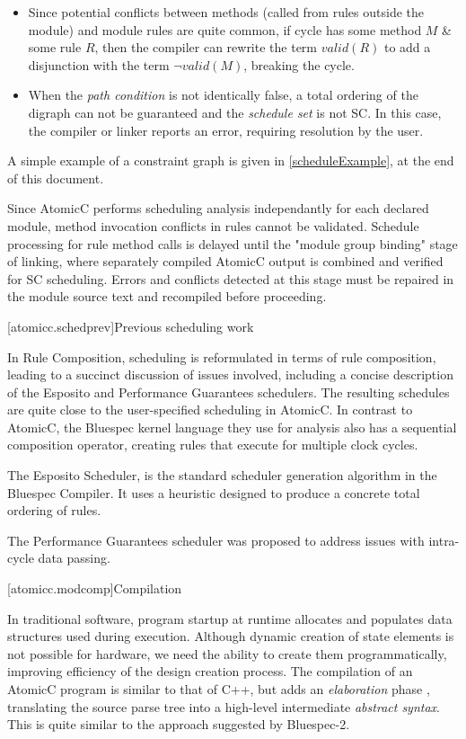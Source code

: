 \begin{itemize}
\item Since potential conflicts between methods (called from rules outside the module)
and module rules are quite common,
if cycle has some method $M$ \& some rule $R$, then the compiler can
rewrite the term $valid(R)$ to add a disjunction with the term $\neg valid(M)$, breaking
the cycle.

\item When the \textit{path condition} is not identically false, a total ordering of
the digraph can not be guaranteed and the \textit{schedule set} is not SC.
In this case, the compiler or linker reports an error,
requiring resolution by the user.
\end{itemize}

A simple example of a constraint graph is given in \ref{scheduleExample}, at the end of this document.

Since AtomicC performs scheduling analysis independantly for each
declared module, method invocation conflicts in rules cannot be validated.
Schedule processing for rule method calls is delayed until the "module group binding"
stage of linking, where separately compiled AtomicC output is combined and
verified
for SC scheduling.  Errors and conflicts detected at this stage must be repaired
in the module source text and recompiled before proceeding.

[atomicc.schedprev]{Previous scheduling work}

In Rule Composition\cite{Dave2007}, scheduling
is reformulated in terms of rule composition, leading to a succinct discussion
of issues involved, including a concise description of the Esposito and
Performance Guarantees schedulers.  The resulting schedules are quite close
to the user-specified scheduling in AtomicC.
In contrast to AtomicC, the Bluespec kernel language they use
for analysis also has a sequential composition operator, creating rules
that execute for multiple clock cycles.

The Esposito Scheduler\cite{Esposito:Patent,Dave2007},
is the standard scheduler generation algorithm in the Bluespec Compiler.
It uses a heuristic designed to produce a concrete total ordering of rules.

The Performance Guarantees scheduler\cite{Rosenband:PerformanceGuarantees}
was proposed to address issues with intra-cycle data passing.

\newpage
{}[atomicc.modcomp]{Compilation}

In traditional software, program startup at runtime allocates
and populates data structures used during execution.  Although dynamic
creation of state elements is not possible for hardware,
we need the ability to create them programmatically, improving
efficiency of the design creation process.
The compilation of an AtomicC program is similar to that of C++, but adds
an \textit{elaboration} phase \cite[Sec.~1]{Milner:1990}\cite{Gillenwater:2008,Memarian:2016,Pfenning},
translating the source parse tree into a high-level
intermediate \textit{abstract syntax}.
This is quite similar to the approach suggested by Bluespec-2\cite{ArvindBS2}.


